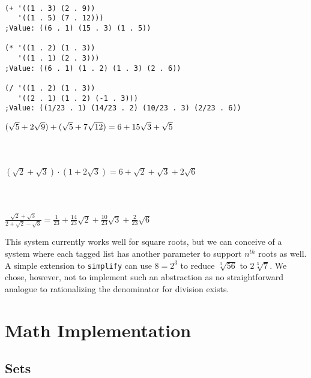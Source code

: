 \documentclass{article}
\begin{document}
 \begin{minipage}[t]{0.5\textwidth}
\begin{verbatim}

(+ '((1 . 3) (2 . 9))
   '((1 . 5) (7 . 12)))
;Value: ((6 . 1) (15 . 3) (1 . 5))

(* '((1 . 2) (1 . 3))
   '((1 . 1) (2 . 3)))
;Value: ((6 . 1) (1 . 2) (1 . 3) (2 . 6))

(/ '((1 . 2) (1 . 3))
   '((2 . 1) (1 . 2) (-1 . 3)))
;Value: ((1/23 . 1) (14/23 . 2) (10/23 . 3) (2/23 . 6))

\end{verbatim}
\end{minipage}
\begin{minipage}[t]{0.5\textwidth}
$\\(\sqrt{5}+2\sqrt{9})+(\sqrt{5} + 7\sqrt{12}) = 6 + 15 \sqrt{3} + \sqrt{5}$\\ \\ \\ \\
$(\sqrt{2} + \sqrt{3}) \cdot (1 + 2\sqrt{3}) = 6 + \sqrt{2} + \sqrt{3} + 2\sqrt{6}$ \\ \\ \\ \\
$\frac{\sqrt{2} + \sqrt{3}}{2 + \sqrt{2} - \sqrt{3}} = \frac{1}{23} + \frac{14}{23}\sqrt{2} + \frac{10}{23} \sqrt{3} + \frac{2}{23} \sqrt{6}$\\
\end{minipage}

                
                This system currently works well for square roots, but we can conceive of a system where each tagged list has another parameter to support $n^{th}$ roots as well. A simple extension to \texttt{simplify} can use $8 = 2^3$ to reduce $\sqrt[3]{56}$ to $2\sqrt[3]{7}$. We chose, however, not to implement such an abstraction as no straightforward analogue to rationalizing the denominator for division exists.
            
        
    
    \section{Math Implementation}
        
        \subsection{Sets}
            
\end{document}
